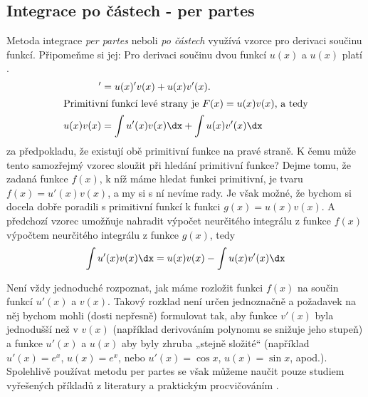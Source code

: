     \subsection{Integrace po částech - per partes}
      Metoda integrace \emph{per partes} neboli \emph{po částech} využívá vzorce pro derivaci 
      součinu funkcí. Připomeňme si jej: Pro derivaci součinu dvou funkcí \(u(x)\) a \(u(x)\) platí
      \cite[p.~137]{Musilova2009MA1}.
      \begin{align}
        [u(x)v(x)]' &= u(x)'v(x) + u(x)v'(x).  \label{MA:eq_Int29} \\
        \shortintertext{Primitivní funkcí levé strany je \(F(x) = u(x)v(x)\), a tedy}
        u(x)v(x)    &=  \int u'(x)v(x)\dx + \int u(x)v'(x)\dx \nonumber
      \end{align}  
      za předpokladu, že existují obě primitivní funkce na pravé straně. K čemu může tento 
      samozřejmý vzorec sloužit při hledání primitivní funkce? Dejme tomu, že zadaná funkce 
      \(f(x)\), k níž máme hledat funkci primitivní, je tvaru \(f(x) = u'(x)v(x)\), a my si s ní 
      nevíme rady. Je však možné, že bychom si docela dobře poradili s primitivní funkcí k funkci 
      \(g(x) = u(x)v(x)\). A předchozí vzorec umožňuje nahradit výpočet neurčitého integrálu z 
      funkce \(f(x)\) výpočtem neurčitého integrálu z funkce \(g(x)\), tedy
      \begin{equation}\label{ma:eq_perpartes}
        \int u'(x)v(x)\dx = u(x)v(x) - \int u(x)v'(x)\dx 
      \end{equation}

      

      Není vždy jednoduché rozpoznat, jak máme rozložit funkci \(f(x)\) na součin funkcí \(u'(x)\) 
      a \(v(x)\). Takový rozklad není určen jednoznačně a požadavek na něj bychom mohli (dosti 
      nepřesně) formulovat tak, aby funkce \(v'(x)\) byla jednodušší než v \(v(x)\) (například 
      derivováním polynomu se snižuje jeho stupeň) a funkce \(u'(x)\) a \(u(x)\) aby byly zhruba 
      „stejně složité“ (například \(u'(x) =e^x\), \(u(x) = e^x\), nebo \(u'(x) = \cos x\), \(u(x) = 
      \sin x\), apod.). Spolehlivě používat metodu per partes se však můžeme naučit pouze studiem 
      vyřešených příkladů z literatury a praktickým procvičováním \cite[p.~138]{Musilova2009MA1}.
  

